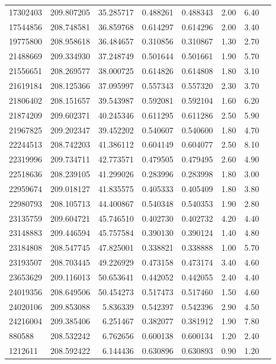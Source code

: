 \begin{longtable}{lrrrrrrr}
17302403 & 209.807205 & 35.285717 & 0.488261 & 0.488343 & 2.00 & 6.40 \\
17544856 & 208.748581 & 36.859768 & 0.614297 & 0.614296 & 2.00 & 3.40 \\
19775800 & 208.958618 & 36.484657 & 0.310856 & 0.310867 & 1.30 & 2.70 \\
21488669 & 209.334930 & 37.248749 & 0.501644 & 0.501661 & 1.90 & 5.70 \\
21556651 & 208.269577 & 38.000725 & 0.614826 & 0.614808 & 1.80 & 3.10 \\
21619184 & 208.125366 & 37.095997 & 0.557343 & 0.557320 & 2.30 & 3.70 \\
21806402 & 208.151657 & 39.543987 & 0.592081 & 0.592104 & 1.60 & 6.20 \\
21874209 & 209.602371 & 40.245346 & 0.611295 & 0.611286 & 2.50 & 5.90 \\
21967825 & 209.202347 & 39.452202 & 0.540607 & 0.540600 & 1.80 & 4.70 \\
22244513 & 208.742203 & 41.386112 & 0.604149 & 0.604077 & 2.50 & 8.10 \\
22319996 & 209.734711 & 42.773571 & 0.479505 & 0.479495 & 2.60 & 4.90 \\
22518636 & 208.239105 & 41.299026 & 0.283996 & 0.283998 & 1.80 & 3.00 \\
22959674 & 209.018127 & 41.835575 & 0.405333 & 0.405409 & 1.80 & 3.80 \\
22980793 & 208.105713 & 44.400867 & 0.540348 & 0.540353 & 1.90 & 2.80 \\
23135759 & 209.604721 & 45.746510 & 0.402730 & 0.402732 & 4.20 & 4.40 \\
23148883 & 209.446594 & 45.757584 & 0.390130 & 0.390124 & 1.40 & 4.80 \\
23184808 & 208.547745 & 47.825001 & 0.338821 & 0.338888 & 1.00 & 5.70 \\
23193507 & 208.703445 & 49.226929 & 0.473158 & 0.473174 & 3.40 & 4.60 \\
23653629 & 209.116013 & 50.653641 & 0.442052 & 0.442055 & 2.40 & 4.40 \\
24019356 & 208.649506 & 50.454273 & 0.517473 & 0.517460 & 1.50 & 4.60 \\
24020106 & 209.853088 & 5.836339 & 0.542397 & 0.542396 & 2.90 & 4.50 \\
24216004 & 209.385406 & 6.251467 & 0.382077 & 0.381912 & 1.90 & 7.80 \\
880588 & 208.532242 & 6.762656 & 0.600138 & 0.600134 & 1.20 & 2.40 \\
1212611 & 208.592422 & 6.144436 & 0.630896 & 0.630893 & 0.90 & 1.20 \\

\end{longtable}
